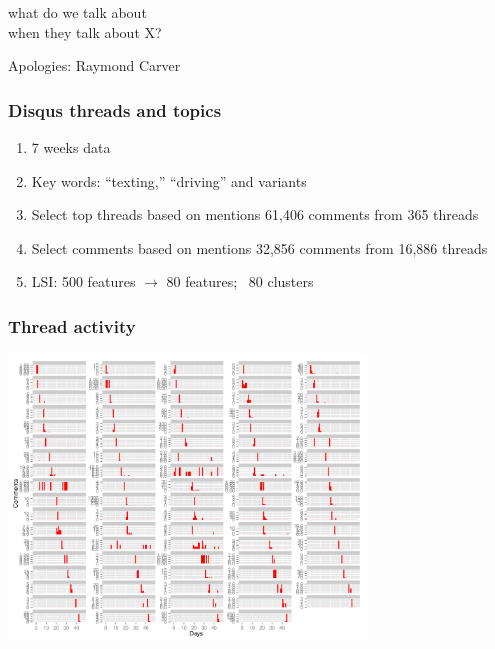\documentclass{beamer}
\begin{document}
\begin{frame}
\begin{center}
{\Huge what do we talk about \\ [15pt] when they talk about X?} 
\end{center}
\hfill Apologies: Raymond Carver \\
\end{frame}

\begin{frame}\frametitle{Disqus threads and topics}
\begin{center}
{\Large 
\begin{enumerate}
\item 7 weeks data
\item Key words: ``texting,'' ``driving'' and variants
\item Select top threads based on mentions 61,406 comments from 365 threads
\item Select comments based on mentions 32,856 comments from 16,886 threads
\item LSI: 500 features $\rightarrow$ 80 features; ~80 clusters
\end{enumerate}
}
\end{center}
\end{frame}

\begin{frame}\frametitle{Thread activity}
  \begin{center}
    \includegraphics[width=9.5cm]{./imgs/DT_timebythread.pdf}
  \end{center}
\end{frame}
\end{document}
